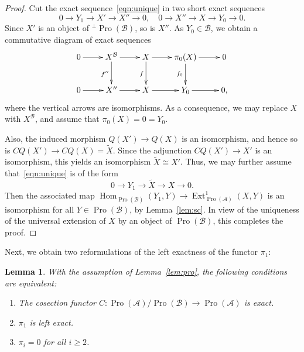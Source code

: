 \documentclass[11pt]{article}
\newtheorem{lemm}[theo]{Lemma}
\theoremstyle{definition}
\numberwithin{equation}{section}
\newcommand\cA{{\mathcal A}}
\newcommand\cB{{\mathcal B}}
\newcommand\tX{{\widetilde X}}
\DeclareMathOperator{\Ext}{Ext}
\DeclareMathOperator{\Hom}{Hom}
\DeclareMathOperator{\Pro}{Pro}
\theoremstyle{remark}
\newcommand*{\romanenumi}{}%
\begin{document}
\begin{proof}
Cut the exact sequence~\eqref{eqn:unique} in two short exact sequences
\[
0 \longrightarrow Y_1 \longrightarrow X'
\longrightarrow X'' \longrightarrow 0, \quad 0 \longrightarrow X'' \longrightarrow X
\longrightarrow Y_0 \longrightarrow 0.
\]
Since $X' $ is an object of ${^{\perp}\Pro(\cB)}$, so is $X''$. As $Y_0 \in \cB$, we obtain a commutative diagram of exact sequences
\[
\xymatrix{ 0 \ar[r] & X^{\cB} \ar[r] \ar[d]_{f''} & X \ar[r] \ar[d]_{f} & \pi_0(X) \ar[r] \ar[d]_{f_0} & 0 \\
0 \ar[r] & X'' \ar[r] & X \ar[r] & Y_0 \ar[r] & 0, \\
}
\]
where the vertical arrows are isomorphisms. As a consequence, we may replace $X$ with $X^{\cB}$, and assume that $\pi_0(X) = 0 = Y_0$.

Also, the induced morphism $Q(X') \to Q(X)$ is an isomorphism, and hence so is $CQ(X') \to CQ(X) = \tX$. Since the adjunction $CQ(X') \to X'$ is an isomorphism, this yields an isomorphism $\tX \cong X'$. Thus, we may further assume that~\eqref{eqn:unique} is of the form
\[
0 \longrightarrow Y_1 \longrightarrow \tX
\longrightarrow X \longrightarrow 0.
\]
Then the associated map $\Hom_{\Pro(\cB)}(Y_1,Y) \to \Ext^1_{\Pro(\cA)}(X,Y)$ is an isomorphism for all $Y \in \Pro(\cB)$, by Lemma~\ref{lem:sc}. In view of the uniqueness of the universal extension of $X$ by an object of $\Pro(\cB)$, this completes the proof.
\end{proof}

Next, we obtain two reformulations of the left exactness of the functor $\pi_1$:

\begin{lemm}\label{lem:vanishing}
With the assumption of Lemma~\ref{lem:pro}, the following conditions are equivalent:
\begin{enumerate}\romanenumi
\item \label{2.9.1} The cosection functor $C : \Pro(\cA)/\Pro(\cB) \to \Pro(\cA)$ is exact.
\item \label{2.9.2} $\pi_1$ is left exact.
\item \label{2.9.3} $\pi_i = 0$ for all $i \geq 2$.
\end{enumerate}
\end{lemm}
\end{document}
